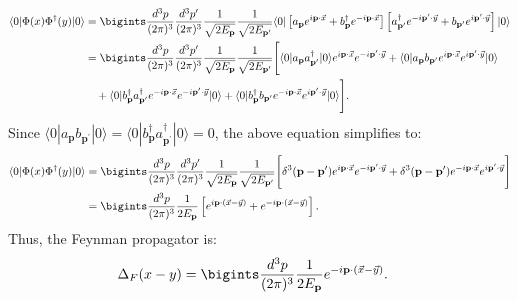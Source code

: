 {\begin{align}
    \langle 0 | \Phi(x) \Phi^\dagger(y) | 0 \rangle &= \bigints \frac{d^3p}{(2\pi)^3} \frac{d^3p^\prime}{(2\pi)^3} \frac{1}{\sqrt{2E_{\mathbf{p}}}} \frac{1}{\sqrt{2E_{\mathbf{p}^\prime}}} \langle 0 | \left[ a_{\mathbf{p}} e^{i \mathbf{p} \cdot \vec{x}} + b^\dagger_{\mathbf{p}} e^{-i \mathbf{p} \cdot \vec{x}} \right] \left[ a^\dagger_{\mathbf{p}^\prime} e^{-i \mathbf{p}^\prime \cdot \vec{y}} + b_{\mathbf{p}^\prime} e^{i \mathbf{p}^\prime \cdot \vec{y}} \right] | 0 \rangle\notag\\
    &= \bigints \frac{d^3p}{(2\pi)^3} \frac{d^3p^\prime}{(2\pi)^3} \frac{1}{\sqrt{2E_{\mathbf{p}}}} \frac{1}{\sqrt{2E_{\mathbf{p}^\prime}}} \Bigg[ \langle 0 | a_{\mathbf{p}} a^\dagger_{\mathbf{p}^\prime} | 0 \rangle e^{i \mathbf{p} \cdot \vec{x}} e^{-i \mathbf{p}^\prime \cdot \vec{y}} + \langle 0 | a_{\mathbf{p}} b_{\mathbf{p}^\prime} e^{i \mathbf{p} \cdot \vec{x}} e^{i \mathbf{p}^\prime \cdot \vec{y}} | 0 \rangle \notag\\
    &\quad + \langle 0 | b^\dagger_{\mathbf{p}} a^\dagger_{\mathbf{p}^\prime} e^{-i \mathbf{p} \cdot \vec{x}} e^{-i \mathbf{p}^\prime \cdot \vec{y}} | 0 \rangle + \langle 0 | b^\dagger_{\mathbf{p}} b_{\mathbf{p}^\prime} e^{-i \mathbf{p} \cdot \vec{x}} e^{i \mathbf{p}^\prime \cdot \vec{y}} | 0 \rangle \Bigg].
\end{align}
Since \(\langle 0 | a_{\mathbf{p}} b_{\mathbf{p}^\prime} | 0 \rangle = \langle 0 | b^\dagger_{\mathbf{p}} a_{\mathbf{p}^\prime}^\dagger | 0 \rangle = 0\), the above equation simplifies to:
\begin{align}
    \langle 0 | \Phi(x) \Phi^\dagger(y) | 0 \rangle &= \bigints \frac{d^3p}{(2\pi)^3} \frac{d^3p^\prime}{(2\pi)^3} \frac{1}{\sqrt{2E_{\mathbf{p}}}} \frac{1}{\sqrt{2E_{\mathbf{p}^\prime}}} \Bigg[ \delta^3(\mathbf{p} - \mathbf{p}^\prime) e^{i \mathbf{p} \cdot \vec{x}} e^{-i \mathbf{p}^\prime \cdot \vec{y}} + \delta^3(\mathbf{p} - \mathbf{p}^\prime) e^{-i \mathbf{p} \cdot \vec{x}} e^{i \mathbf{p}^\prime \cdot \vec{y}} \Bigg]\notag\\
    &= \bigints \frac{d^3p}{(2\pi)^3} \frac{1}{2E_{\mathbf{p}}} \left[ e^{i \mathbf{p} \cdot (\vec{x} - \vec{y})} + e^{-i \mathbf{p} \cdot (\vec{x} - \vec{y})} \right].
\end{align}
Thus, the Feynman propagator is:
\begin{align}
    \Delta_F(x - y) &= \bigints \frac{d^3p}{(2\pi)^3} \frac{1}{2E_{\mathbf{p}}} e^{-i \mathbf{p} \cdot (\vec{x} - \vec{y})}.
\end{align}
}
